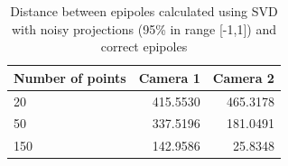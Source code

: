 \documentclass[peerreview,11pt]{IEEEtran}
\begin{document}
\begin{table}[ht]
	\caption{Distance between epipoles calculated using SVD with noisy projections (95\% in range [-1,1]) and correct epipoles}
	\centering
	\begin{tabular}{l | r r }\label{tab:ep_dist_svd_n1}
		Number of points & Camera 1 & Camera 2 \\
		\hline
		20 & 415.5530 & 465.3178 \\
		50 & 337.5196 & 181.0491 \\
		150 & 142.9586 & 25.8348 \\
	\end{tabular}
\end{table}



\begin{figure}[ht]
	\centering

	~
	\\


\end{figure}
\end{document}
